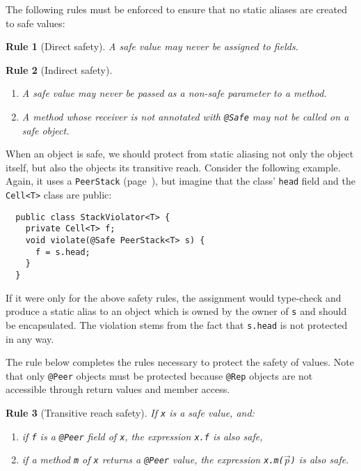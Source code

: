 \documentclass{pracamgr}
\theoremstyle{break}
\theoremstyle{break}
\theoremstyle{break}
\newtheorem{verrule}{Rule}
\begin{document}
The following rules must be enforced to ensure that no static aliases
are created to safe values:

\begin{verrule}[Direct safety]
  A safe value may never be assigned to fields. 
\end{verrule}
\vspace{-1cm}
\begin{verrule}[Indirect safety]
  \begin{enumerate}[label=(\arabic*)]
  \item A safe value may never be passed as a non-safe parameter to a
    method.
  \item A method whose receiver is not annotated with \texttt{@Safe}
    may not be called on a safe object.
  \end{enumerate}
\end{verrule}

When an object is safe, we should protect from static aliasing not
only the object itself, but also the objects its transitive reach.
Consider the following example. Again, it uses a \texttt{PeerStack}
(page~\pageref{lst:stack-peer}), but imagine that the class'
\texttt{head} field and the \texttt{Cell<T>} class are public:
\begin{lstlisting}
  public class StackViolator<T> {
    private Cell<T> f;
    void violate(@Safe PeerStack<T> s) {
      f = s.head;
    }
  }
\end{lstlisting}
If it were only for the above safety rules, the assignment would
type-check and produce a static alias to an object which is owned by
the owner of \texttt{s} and should be encapsulated. The violation
stems from the fact that \texttt{s.head} is not protected in any way.

The rule below completes the rules necessary to protect the safety of
values. Note that only \texttt{@Peer} objects must be protected
because \texttt{@Rep} objects are not accessible through return values
and member access.
\begin{verrule}[Transitive reach safety]
  If \texttt{x} is a safe value, and:
  \begin{enumerate}[label=(\arabic*)]
  \item if \texttt{f} is a \texttt{@Peer} field of \texttt{x}, the
    expression \texttt{x.f} is also safe, 
  \item if a method \texttt{m} of \texttt{x} returns a \texttt{@Peer}
    value, the expression \texttt{x.m($\vec{p}$)} is also safe. 
  \end{enumerate}
\end{verrule}
\end{document}
